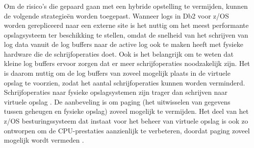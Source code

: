 \subsubsection{}
\label{sec:hybride-opstelling-mitigatiestrategie}

Om de risico's die gepaard gaan met een hybride opstelling te vermijden, kunnen de volgende strategieën worden toegepast.
Wanneer logs in Db2 voor z/OS worden gerepliceerd naar een externe site is het nuttig om het meest performante opslagsysteem ter beschikking te stellen, omdat de snelheid van het schrijven van log data vanuit de log buffers naar de active log ook te maken heeft met fysieke hardware die de schrijfoperaties doet.
Ook is het belangrijk om te weten dat kleine log buffers ervoor zorgen dat er meer schrijfoperaties noodzakelijk zijn.
Het is daarom nuttig om de log buffers van zoveel mogelijk plaats in de virtuele opslag te voorzien, zodat het aantal schrijfoperaties kunnen worden verminderd.
Schrijfoperaties naar fysieke opslagsystemen zijn trager dan schrijven naar virtuele opslag \autocite{wisniewski_2017_benefits_more_memory}.
De aanbeveling is om paging (het uitwisselen van gegevens tussen geheugen en fysieke opslag) zoveel mogelijk te vermijden.
Het deel van het z/OS besturingssysteem dat instaat voor het beheer van virtuele opslag is ook zo ontworpen om de CPU-prestaties aanzienlijk te verbeteren, doordat paging zoveel mogelijk wordt vermeden \autocite{ibm_2026_zos_virtual_storage_management}.

